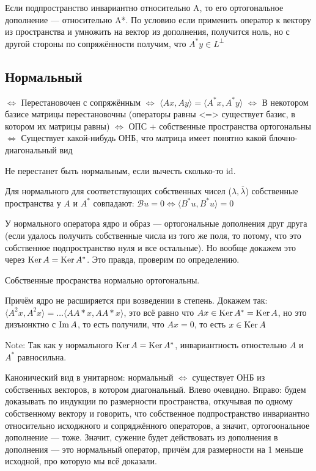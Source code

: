 \documentclass[12pt, a4paper]{article}
\begin{document}
Если подпространство инвариантно относительно A, то его ортогональное дополнение — относительно A*.
По условию если применить оператор к вектору из пространства и умножить на вектор из дополнения, получится ноль, но с другой стороны по сопряжённости получим, что $A^* y \in {L^\perp}$


\subsection{Нормальный}

$\Longleftrightarrow$ Перестановочен с сопряжённым 
$\Longleftrightarrow$ $\langle A x, A y \rangle = \langle A^* x, A^* y \rangle$ 
$\Longleftrightarrow$ В некотором базисе матрицы перестановочны (операторы равны <=> существует базис, в котором их матрицы равны)
$\Longleftrightarrow$ ОПС + собственные пространства ортогональны 
$\Longleftrightarrow$ Существует какой-нибудь ОНБ, что матрица имеет понятно какой блочно-диагональный вид


Не перестанет быть нормальным, если вычесть сколько-то id.

Для нормального для соответствующих собственных чисел ($\lambda, \overline{\lambda}$) собственные пространства у $A$ и $A^*$ совпадают: $\mathcal{B} u = 0 \Leftrightarrow \langle B^* u, B^* u \rangle = 0$



У нормального оператора ядро и образ — ортогональные дополнения друг друга 
(если удалось получить собственные числа из того же поля, то потому, что это собственное подпространство нуля и все остальные).
Но вообще докажем это через $\operatorname{Ker} A = \operatorname{Ker} A^*$. Это правда, проверим по определению.

Собственные просранства нормально ортогональны.

Причём ядро не расширяется при возведении в степень.
Докажем так: $\langle A^2 x, A^2 x \rangle = … \langle AA* x, AA* x \rangle$, это всё равно что $Ax \in \operatorname{Ker} A^* = \operatorname{Ker} A$, но это дизъюнктно с $\operatorname{Im} A$, то есть получили, что $Ax = 0$, то есть $x \in \operatorname{Ker} A$

Note: Так как у нормального $\operatorname{Ker} A = \operatorname{Ker} A^*$, инвариантность отностельно $A$ и$A^*$ равносильна.

Канонический вид в унитарном: нормальный $\Leftrightarrow$ существует ОНБ из собственных векторов, в котором диагональный.
Влево очевидно.
Вправо: будем доказывать по индукции по размерности пространства, откучывая по одному собственному вектору и говорить, 
что собственное подпространство инвариантно относительно исходжного и сопряджённого операторов, а значит, ортогоональное дополнение — тоже. 
Значит, сужение будет действовать из дополнения в дополнения — это нормальный оператор, причём для размерности на 1 меньше исходной, про которую мы всё доказали.
\end{document}
